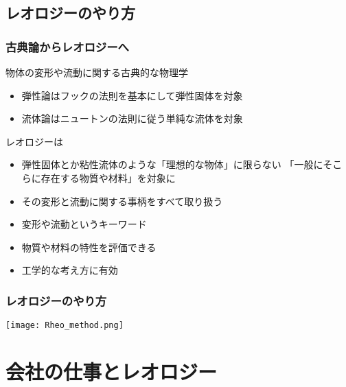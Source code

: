 \documentclass[12pt, dvipdfmx]{beamer}
\begin{document}
\subsection{レオロジーのやり方}
\begin{frame}
	\frametitle{古典論からレオロジーへ}
		\begin{block}{物体の変形や流動に関する古典的な物理学}
			\begin{itemize}
				\item 弾性論はフックの法則を基本にして弾性固体を対象
				\item 流体論はニュートンの法則に従う単純な流体を対象
			\end{itemize}
		\end{block}
	\begin{exampleblock}{レオロジーは}
		\begin{itemize}
			\item 弾性固体とか粘性流体のような「理想的な物体」に限らない
			「一般にそこらに存在する物質や材料」を対象に
			\item その変形と流動に関する事柄をすべて取り扱う
			\item 変形や流動というキーワード
			\item 物質や材料の特性を評価できる
			\item 工学的な考え方に有効
		\end{itemize}
	\end{exampleblock}
\end{frame}

\begin{frame}
	\frametitle{レオロジーのやり方}
	\begin{center}
		\texttt{[image: Rheo\_method.png]}
	\end{center}
\end{frame}

\section{会社の仕事とレオロジー}
\end{document}
